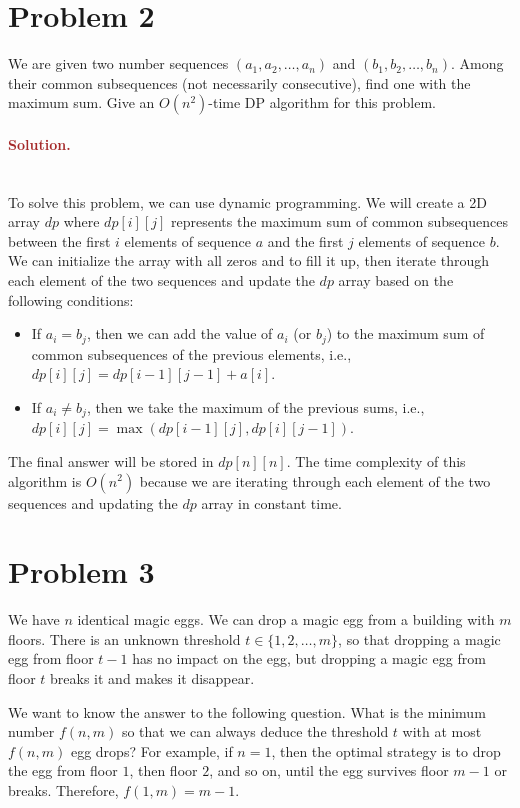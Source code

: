\section*{Problem 2}
We are given two number sequences $(a_1, a_2, \ldots, a_n)$ and $(b_1, b_2, \ldots, b_n)$. Among their common subsequences (not necessarily consecutive), find one with the maximum sum. Give an $O(n^2)$-time DP algorithm for this problem.

\paragraph{\textcolor{brown}{Solution.}} \: \\
To solve this problem, we can use dynamic programming. We will create a 2D array $dp$ where $dp[i][j]$ represents the maximum sum of common subsequences between the first $i$ elements of sequence $a$ and the first $j$ elements of sequence $b$. We can initialize the array with all zeros and to fill it up, then iterate through each element of the two sequences and update the $dp$ array based on the following conditions:
\begin{itemize}
    \item If $a_i = b_j$, then we can add the value of $a_i$ (or $b_j$) to the maximum sum of common subsequences of the previous elements, i.e., $dp[i][j] = dp[i-1][j-1] + a[i]$.
    \item If $a_i \neq b_j$, then we take the maximum of the previous sums, i.e., $dp[i][j] = \max(dp[i-1][j], dp[i][j-1])$.
\end{itemize}
The final answer will be stored in $dp[n][n]$.
The time complexity of this algorithm is $O(n^2)$ because we are iterating through each element of the two sequences and updating the $dp$ array in constant time.


\section*{Problem 3}
We have $n$ identical magic eggs. We can drop a magic egg from a building with $m$ floors. There is an unknown threshold $t \in \{1, 2, \ldots, m\}$, so that dropping a magic egg from floor $t - 1$ has no impact on the egg, but dropping a magic egg from floor $t$ breaks it and makes it disappear.

We want to know the answer to the following question. What is the minimum number $f(n, m)$ so that we can always deduce the threshold $t$ with at most $f(n, m)$ egg drops? For example, if $n = 1$, then the optimal strategy is to drop the egg from floor $1$, then floor $2$, and so on, until the egg survives floor $m - 1$ or breaks. Therefore, $f(1, m) = m - 1$.

